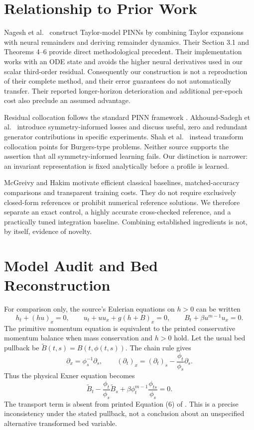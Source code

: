 \documentclass[11pt,a4paper]{article}
\theoremstyle{definition}
\theoremstyle{remark}
\begin{document}
\section{Relationship to Prior Work}\label{sec:prior}
Nagesh et al.~\cite{taylor} construct Taylor-model PINNs by combining Taylor expansions with neural remainders and deriving remainder dynamics. Their Section 3.1 and Theorems 4--6 provide direct methodological precedent. Their implementation works with an ODE state and avoids the higher neural derivatives used in our scalar third-order residual. Consequently our construction is not a reproduction of their complete method, and their error guarantees do not automatically transfer. Their reported longer-horizon deterioration and additional per-epoch cost also preclude an assumed advantage.

Residual collocation follows the standard PINN framework \cite{pinn}. Akhound-Sadegh et al.~\cite{liepinn} introduce symmetry-informed losses and discuss useful, zero and redundant generator contributions in specific experiments. Shah et al.~\cite{shah} instead transform collocation points for Burgers-type problems. Neither source supports the assertion that all symmetry-informed learning fails. Our distinction is narrower: an invariant representation is fixed analytically before a profile is learned.

McGreivy and Hakim \cite{baselines} motivate efficient classical baselines, matched-accuracy comparisons and transparent training costs. They do not require exclusively closed-form references or prohibit numerical reference solutions. We therefore separate an exact control, a highly accurate cross-checked reference, and a practically tuned integration baseline. Combining established ingredients is not, by itself, evidence of novelty.

\section{Model Audit and Bed Reconstruction}\label{sec:audit}
For comparison only, the source's Eulerian equations on $h>0$ can be written
\begin{equation}
h_t+(hu)_x=0,\qquad
u_t+uu_x+g(h+B)_x=0,\qquad
B_t+\beta u^{m-1}u_x=0.
\label{eq:euler}
\end{equation}
The primitive momentum equation is equivalent to the printed conservative momentum balance when mass conservation and $h>0$ hold. Let the usual bed pullback be $\widetilde B(t,s)=B(t,\phi(t,s))$. The chain rule gives
\begin{equation}
\partial_x=\phi_s^{-1}\partial_s,\qquad
(\partial_t)_x=(\partial_t)_s-\frac{\phi_t}{\phi_s}\partial_s.
\label{eq:chain}
\end{equation}
Thus the physical Exner equation becomes
\begin{equation}
\widetilde B_t-\frac{\phi_t}{\phi_s}\widetilde B_s+
\beta\phi_t^{m-1}\frac{\phi_{ts}}{\phi_s}=0.
\label{eq:physicalbed}
\end{equation}
The transport term is absent from printed Equation (6) of \cite{lagrange}. This is a precise inconsistency under the stated pullback, not a conclusion about an unspecified alternative transformed bed variable.
\end{document}
